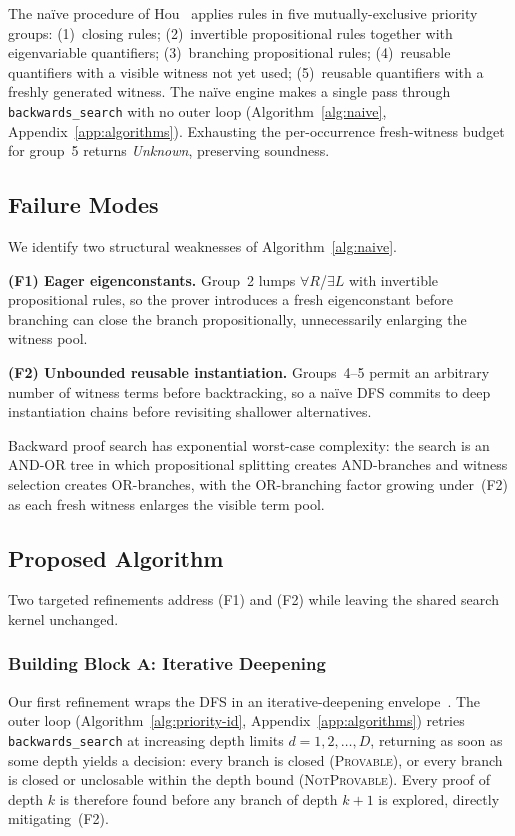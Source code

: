 The na\"ive procedure of Hou~\cite[Algorithm~2, p.~67]{hou2021fundamentals}
applies rules in five mutually-exclusive priority groups: (1)~closing
rules; (2)~invertible propositional rules together with eigenvariable
quantifiers; (3)~branching propositional rules; (4)~reusable quantifiers
with a visible witness not yet used; (5)~reusable quantifiers with a
freshly generated witness.
The na\"ive engine makes a single pass through \texttt{backwards\_search}
with no outer loop (Algorithm~\ref{alg:naive}, Appendix~\ref{app:algorithms}).
Exhausting the per-occurrence fresh-witness budget for group~5 returns
\textit{Unknown}, preserving soundness.

\subsection{Failure Modes}\label{sec:failure}

We identify two structural weaknesses of Algorithm~\ref{alg:naive}.

\textbf{(F1) Eager eigenconstants.}
Group~2 lumps $\forall R$/$\exists L$ with invertible propositional rules, so
the prover introduces a fresh eigenconstant before branching can close the
branch propositionally, unnecessarily enlarging the witness pool.

\textbf{(F2) Unbounded reusable instantiation.}
Groups~4--5 permit an arbitrary number of witness terms before backtracking,
so a na\"ive DFS commits to deep instantiation chains before revisiting
shallower alternatives.

Backward proof search has exponential worst-case complexity: the search is
an AND-OR tree in which propositional splitting creates AND-branches and
witness selection creates OR-branches, with the OR-branching factor growing
under~(F2) as each fresh witness enlarges the visible term pool.

\subsection{Proposed Algorithm}\label{sec:proposed}

Two targeted refinements address (F1) and (F2) while leaving the shared
search kernel unchanged.

\subsubsection{Building Block A: Iterative Deepening}

Our first refinement wraps the DFS in an iterative-deepening
envelope~\cite{korf1985iterative}. The outer loop
(Algorithm~\ref{alg:priority-id}, Appendix~\ref{app:algorithms}) retries
\texttt{backwards\_search} at increasing depth limits $d = 1, 2, \ldots, D$,
returning as soon as some depth yields a decision: every branch is closed
(\textsc{Provable}), or every branch is closed or unclosable within the
depth bound (\textsc{NotProvable}). Every proof of depth $k$ is therefore
found before any branch of depth $k{+}1$ is explored, directly
mitigating~(F2).


